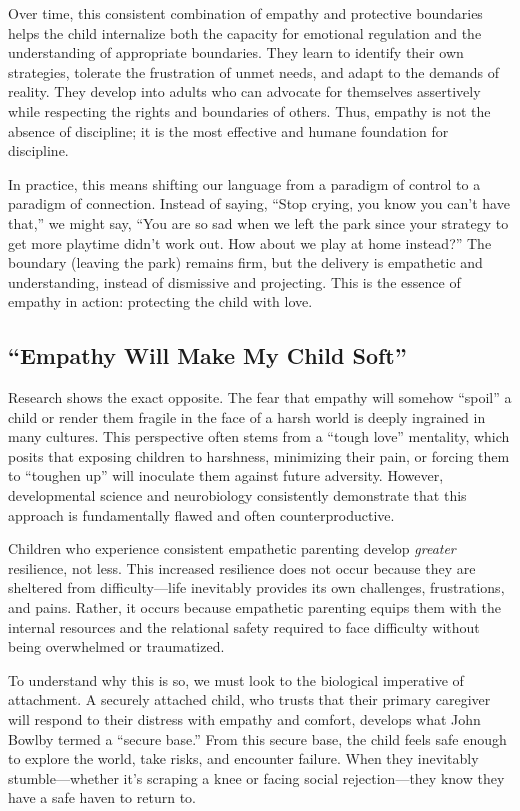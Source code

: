 Over time, this consistent combination of empathy and protective boundaries helps the child internalize both the capacity for emotional regulation and the understanding of appropriate boundaries.
They learn to identify their own strategies, tolerate the frustration of unmet needs, and adapt to the demands of reality.
They develop into adults who can advocate for themselves assertively while respecting the rights and boundaries of others.
Thus, empathy is not the absence of discipline; it is the most effective and humane foundation for discipline.

In practice, this means shifting our language from a paradigm of control to a paradigm of connection.
Instead of saying, ``Stop crying, you know you can't have that,'' we might say, ``You are so sad when we left the park since your strategy to get more playtime didn't work out.
How about we play at home instead?'' 
The boundary (leaving the park) remains firm, but the delivery is empathetic and understanding, instead of dismissive and projecting.
This is the essence of empathy in action: protecting the child with love.

\subsection{``Empathy Will Make My Child Soft''}

Research \citep{gottman1997, siegel2011} shows the exact opposite.
The fear that empathy will somehow ``spoil'' a child or render them fragile in the face of a harsh world is deeply ingrained in many cultures.
This perspective often stems from a ``tough love'' mentality, which posits that exposing children to harshness, minimizing their pain, or forcing them to ``toughen up'' will inoculate them against future adversity.
However, developmental science and neurobiology consistently demonstrate that this approach is fundamentally flawed and often counterproductive.

Children who experience consistent empathetic parenting develop \textit{greater} resilience, not less.
This increased resilience does not occur because they are sheltered from difficulty---life inevitably provides its own challenges, frustrations, and pains.
Rather, it occurs because empathetic parenting equips them with the internal resources and the relational safety required to face difficulty without being overwhelmed or traumatized.

To understand why this is so, we must look to the biological imperative of attachment.
A securely attached child, who trusts that their primary caregiver will respond to their distress with empathy and comfort, develops what John Bowlby termed a ``secure base.''
From this secure base, the child feels safe enough to explore the world, take risks, and encounter failure.
When they inevitably stumble---whether it's scraping a knee or facing social rejection---they know they have a safe haven to return to.

